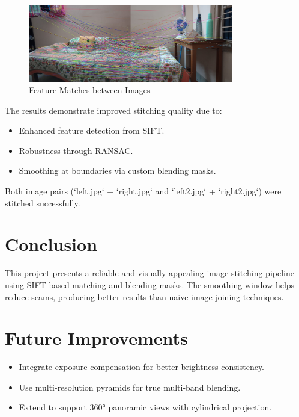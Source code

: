 \documentclass[12pt]{article}
\begin{document}
\begin{figure}[H]
    \centering
    \includegraphics[width=0.8\textwidth]{matching2.jpg}
    \caption{Feature Matches between Images}
    \label{fig:matches}
\end{figure}
The results demonstrate improved stitching quality due to:
\begin{itemize}
    \item Enhanced feature detection from SIFT.
    \item Robustness through RANSAC.
    \item Smoothing at boundaries via custom blending masks.
\end{itemize}

Both image pairs (`left.jpg` + `right.jpg` and `left2.jpg` + `right2.jpg`) were stitched successfully.

\section{Conclusion}
This project presents a reliable and visually appealing image stitching pipeline using SIFT-based matching and blending masks. The smoothing window helps reduce seams, producing better results than naive image joining techniques.

\section{Future Improvements}
\begin{itemize}
    \item Integrate exposure compensation for better brightness consistency.
    \item Use multi-resolution pyramids for true multi-band blending.
    \item Extend to support 360° panoramic views with cylindrical projection.
\end{itemize}
\end{document}
